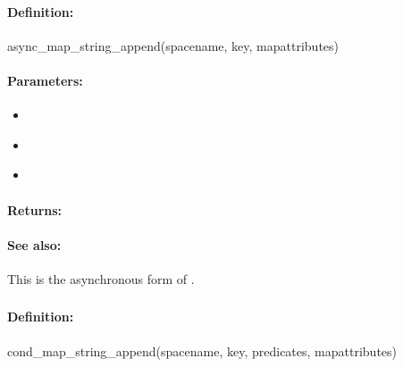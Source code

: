 \paragraph{Definition:}
\begin{rubycode}
async_map_string_append(spacename, key, mapattributes)
\end{rubycode}

\paragraph{Parameters:}
\begin{itemize}[noitemsep]
\item {}\\

\item {}\\

\item {}\\

\end{itemize}

\paragraph{Returns:}


\paragraph{See also:}  This is the asynchronous form of .

\pagebreak
\subsubsection{}
\label{api:ruby:cond_map_string_append}


\paragraph{Definition:}
\begin{rubycode}
cond_map_string_append(spacename, key, predicates, mapattributes)
\end{rubycode}

